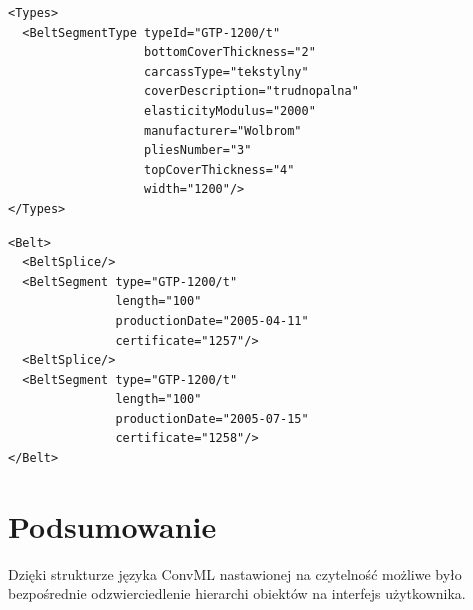 \documentclass{beamer}
\begin{document}
\begin{frame}[fragile]
\begin{verbatim}
<Types>
  <BeltSegmentType typeId="GTP-1200/t"
                   bottomCoverThickness="2"
                   carcassType="tekstylny"
                   coverDescription="trudnopalna"
                   elasticityModulus="2000"
                   manufacturer="Wolbrom"
                   pliesNumber="3"
                   topCoverThickness="4"
                   width="1200"/>
</Types>
\end{verbatim}
\end{frame}

\begin{frame}[fragile]
\begin{verbatim}
<Belt>
  <BeltSplice/>
  <BeltSegment type="GTP-1200/t"
               length="100"
               productionDate="2005-04-11"
               certificate="1257"/>
  <BeltSplice/>
  <BeltSegment type="GTP-1200/t"
               length="100"
               productionDate="2005-07-15"
               certificate="1258"/>
</Belt>
\end{verbatim}
\end{frame}


\section{Podsumowanie}
\begin{frame}
Dzięki strukturze języka ConvML nastawionej na czytelność możliwe było
bezpośrednie odzwierciedlenie hierarchi obiektów na interfejs
użytkownika.
\end{frame}
\end{document}

